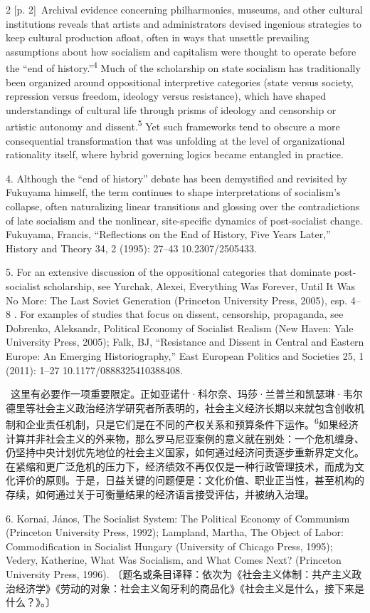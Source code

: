 \documentclass[10pt,a4paper]{article}
\begin{document}
\begin{paracol}{2}
{\scriptsize\color{gray} [p. 2]}\ Archival evidence concerning philharmonics, museums, and other cultural institutions reveals that artists and administrators devised ingenious strategies to keep cultural production afloat, often in ways that unsettle prevailing assumptions about how socialism and capitalism were thought to operate before the “end of history.”\nobreak\textsuperscript{4} Much of the scholarship on state socialism has traditionally been organized around oppositional interpretive categories (state versus society, repression versus freedom, ideology versus resistance), which have shaped understandings of cultural life through prisms of ideology and censorship or artistic autonomy and dissent.\nobreak\textsuperscript{5} Yet such frameworks tend to obscure a more consequential transformation that was unfolding at the level of organizational rationality itself, where hybrid governing logics became entangled in practice.\par{\small 4. Although the “end of history” debate has been demystified and revisited by Fukuyama himself, the term continues to shape interpretations of socialism’s collapse, often naturalizing linear transitions and glossing over the contradictions of late socialism and the nonlinear, site-specific dynamics of post-socialist change. Fukuyama, Francis, “Reflections on the End of History, Five Years Later,” History and Theory 34, 2 (1995): 27–43 10.2307/2505433.\par}{\small 5. For an extensive discussion of the oppositional categories that dominate post-socialist scholarship, see Yurchak, Alexei, Everything Was Forever, Until It Was No More: The Last Soviet Generation (Princeton University Press, 2005), esp. 4–8 . For examples of studies that focus on dissent, censorship, propaganda, see Dobrenko, Aleksandr, Political Economy of Socialist Realism (New Haven: Yale University Press, 2005); Falk, BJ, “Resistance and Dissent in Central and Eastern Europe: An Emerging Historiography,” East European Politics and Societies 25, 1 (2011): 1–27 10.1177/0888325410388408.\par}
\switchcolumn*
{\scriptsize\color{gray} [p. 3]}\ 这里有必要作一项重要限定。正如亚诺什·科尔奈、玛莎·兰普兰和凯瑟琳·韦尔德里等社会主义政治经济学研究者所表明的，社会主义经济长期以来就包含创收机制和企业责任机制，只是它们是在不同的产权关系和预算条件下运\mbox{作。\textsuperscript{6}}如果经济计算并非社会主义的外来物，那么罗马尼亚案例的意义就在别处：一个危机缠身、仍坚持中央计划优先地位的社会主义国家，如何通过经济问责逐步重新界定文化。在紧缩和更广泛危机的压力下，经济绩效不再仅仅是一种行政管理技术，而成为文化评价的原则。于是，日益关键的问题便是：文化价值、职业正当性，甚至机构的存续，如何通过关于可衡量结果的经济语言接受评估，并被纳入治理。\par{\small 6. Kornai, János, The Socialist System: The Political Economy of Communism (Princeton University Press, 1992); Lampland, Martha, The Object of Labor: Commodification in Socialist Hungary (University of Chicago Press, 1995); Vedery, Katherine, What Was Socialism, and What Comes Next? (Princeton University Press, 1996). 〔题名或条目译释：依次为《社会主义体制：共产主义政治经济学》《劳动的对象：社会主义匈牙利的商品化》《社会主义是什么，接下来是什么？》。〕\par}

\end{paracol}
\end{document}
